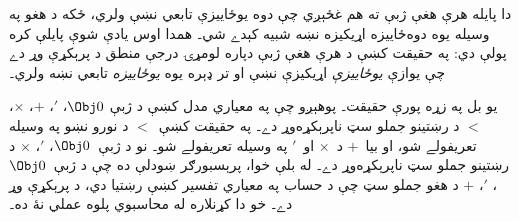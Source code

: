 \documentclass[../../../include/open-logic-section]{subfiles}
\begin{document}
دا پايله هرې هغې ژبې ته هم غځېږي چې دوه يوځاييزې تابعي نښې ولري،
ځکه د هغو په وسيله يوه دوه‌ځاييزه اړيکيزه نښه شبيه کېدے شي۔ همدا
اوس يادې شوې پايلې کره پولې دي: په حقيقت کښې د هرې هغې ژبې دپاره
لومړۍ درجې منطق د پرېکړې وړ دے چې يوازې \emph{يوځاييزې} اړيکيزې
نښې او تر ډېره يوه \emph{يوځاييزه} تابعي نښه ولري۔

يو بل په زړه پورې حقيقت۔ پوهېږو چې په معياري مدل کښې د ژبې
$\Obj 0$، $'$، $+$، $\times$، $<$ د رښتينو جملو سټ ناپرېکړه‌وړ
دے۔ په حقيقت کښې~$<$ د نورو نښو په وسيله تعريفولے شو، او بيا~$+$
د~$\times$ او~$'$ په وسيله تعريفولے شو۔ نو د ژبې~$\Obj 0$، $'$،
$\times$ د رښتينو جملو سټ ناپرېکړه‌وړ دے۔ له بلې خوا، پرېسبورګر
ښودلې ده چې د ژبې~$\Obj 0$، $'$، $+$ د هغو جملو سټ چې د حساب په
معياري تفسير کښې رښتيا دي، د پرېکړې وړ دے۔
خو دا کړنلاره له محاسبوي پلوه عملي نۀ ده۔
\end{document}

